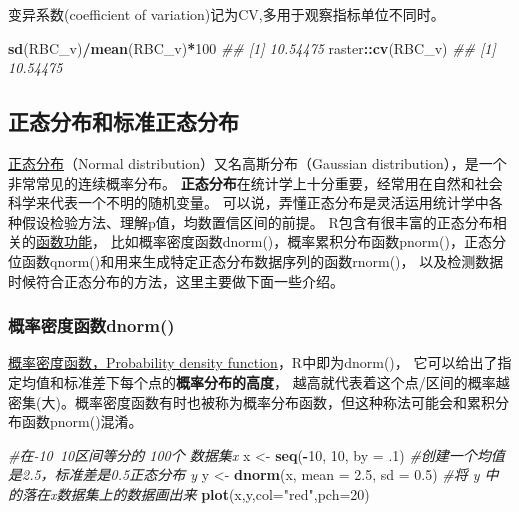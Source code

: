 \documentclass[
]{article}
\newenvironment{Shaded}{\begin{snugshade}}{\end{snugshade}}
\newcommand{\CommentTok}[1]{\textcolor[rgb]{0.56,0.35,0.01}{\textit{#1}}}
\newcommand{\DataTypeTok}[1]{\textcolor[rgb]{0.13,0.29,0.53}{#1}}
\newcommand{\DecValTok}[1]{\textcolor[rgb]{0.00,0.00,0.81}{#1}}
\newcommand{\FloatTok}[1]{\textcolor[rgb]{0.00,0.00,0.81}{#1}}
\newcommand{\KeywordTok}[1]{\textcolor[rgb]{0.13,0.29,0.53}{\textbf{#1}}}
\newcommand{\NormalTok}[1]{#1}
\newcommand{\OperatorTok}[1]{\textcolor[rgb]{0.81,0.36,0.00}{\textbf{#1}}}
\newcommand{\StringTok}[1]{\textcolor[rgb]{0.31,0.60,0.02}{#1}}
\begin{document}
变异系数(coefficient of variation)记为CV,多用于观察指标单位不同时。

\begin{Shaded}
\begin{Highlighting}[]
\KeywordTok{sd}\NormalTok{(RBC_v)}\OperatorTok{/}\KeywordTok{mean}\NormalTok{(RBC_v)}\OperatorTok{*}\DecValTok{100}
\CommentTok{## [1] 10.54475}
\NormalTok{raster}\OperatorTok{::}\KeywordTok{cv}\NormalTok{(RBC_v)}
\CommentTok{## [1] 10.54475}
\end{Highlighting}
\end{Shaded}

\hypertarget{ux6b63ux6001ux5206ux5e03ux548cux6807ux51c6ux6b63ux6001ux5206ux5e03}{%
\subsection{正态分布和标准正态分布}\label{ux6b63ux6001ux5206ux5e03ux548cux6807ux51c6ux6b63ux6001ux5206ux5e03}}

\href{https://zh.wikipedia.org/zh-cn/\%E6\%AD\%A3\%E6\%80\%81\%E5\%88\%86\%E5\%B8\%83}{正态分布}（Normal distribution）又名高斯分布（Gaussian distribution），是一个非常常见的连续概率分布。
\textbf{正态分布}在统计学上十分重要，经常用在自然和社会科学来代表一个不明的随机变量。
可以说，弄懂正态分布是灵活运用统计学中各种假设检验方法、理解p值，均数置信区间的前提。
R包含有很丰富的正态分布相关的\href{https://stat.ethz.ch/R-manual/R-devel/library/stats/html/Normal.html}{函数功能}，
比如概率密度函数dnorm()，概率累积分布函数pnorm()，正态分位函数qnorm()和用来生成特定正态分布数据序列的函数rnorm()，
以及检测数据时候符合正态分布的方法，这里主要做下面一些介绍。

\hypertarget{ux6982ux7387ux5bc6ux5ea6ux51fdux6570dnorm}{%
\subsubsection{概率密度函数dnorm()}\label{ux6982ux7387ux5bc6ux5ea6ux51fdux6570dnorm}}

\href{https://zh.wikipedia.org/zh-cn/\%E6\%A9\%9F\%E7\%8E\%87\%E5\%AF\%86\%E5\%BA\%A6\%E5\%87\%BD\%E6\%95\%B8}{概率密度函数，Probability density function}，R中即为dnorm()，
它可以给出了指定均值和标准差下每个点的\textbf{概率分布的高度}，
越高就代表着这个点/区间的概率越密集(大)。概率密度函数有时也被称为概率分布函数，但这种称法可能会和累积分布函数pnorm()混淆。

\begin{Shaded}
\begin{Highlighting}[]
\CommentTok{#在-10~10区间等分的 100个 数据集x}
\NormalTok{x <-}\StringTok{ }\KeywordTok{seq}\NormalTok{(}\OperatorTok{-}\DecValTok{10}\NormalTok{, }\DecValTok{10}\NormalTok{, }\DataTypeTok{by =} \FloatTok{.1}\NormalTok{)}
\CommentTok{#创建一个均值是2.5，标准差是0.5正态分布 y}
\NormalTok{y <-}\StringTok{ }\KeywordTok{dnorm}\NormalTok{(x, }\DataTypeTok{mean =} \FloatTok{2.5}\NormalTok{, }\DataTypeTok{sd =} \FloatTok{0.5}\NormalTok{)}
\CommentTok{#将 y 中的落在x数据集上的数据画出来}
\KeywordTok{plot}\NormalTok{(x,y,}\DataTypeTok{col=}\StringTok{"red"}\NormalTok{,}\DataTypeTok{pch=}\DecValTok{20}\NormalTok{)}
\end{Highlighting}
\end{Shaded}
\end{document}
